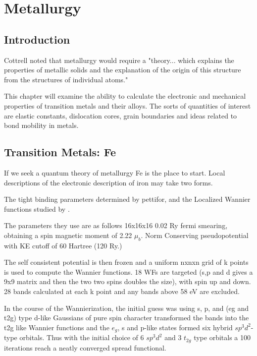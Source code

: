 \chapter{Metallurgy}
\section{Introduction}
Cottrell noted that metallurgy would require a "theory... which explains
the properties of metallic solids and the explanation of the origin of this
structure from the structures of individual atoms." 

This chapter will examine the ability to calculate the electronic and mechanical
properties of transition metals and their alloys. The sorts of quantities
of interest are elastic constants, dislocation cores, grain boundaries
and ideas related to bond mobility in metals.





\section{Transition Metals: Fe}
If we seek a quantum theory of metallurgy Fe is the place to start.
Local descriptions of the electronic description of iron may take two forms. 

The tight binding parameters determined by pettifor, and the Localized 
Wannier functions studied by \cite{yates06}. 

The parameters they use are as follows 16x16x16 0.02 Ry fermi smearing, obtaining
a spin magnetic moment of 2.22 $\mu_{b}$. Norm Conserving pseudopotential with KE cutoff
of 60 Hartree (120 Ry.)

The self consistent potential is then frozen and a uniform nxnxn grid of k points is
used to compute the Wannier functions. 18 WFs are targeted (s,p and d gives a 9x9 matrix
and then the two two spins doubles the size), with spin up and 
down. 28 bands calculated at each k point and any bands above 58 eV are excluded.

In the course of the Wannierization, the initial guess was using s, p, and (eg and t2g)
type d-like Gaussians of pure spin character transformed the bands into the t2g like 
Wannier functions and the $e_{g}$, s and p-like states formed six hybrid 
$sp^{3}d^{2}$-type orbitals. Thus with the initial choice of 6 $sp^{3}d^{2}$ and 3 
$t_{2g}$  type orbitals a 100 iterations reach a neatly converged spread functional.

